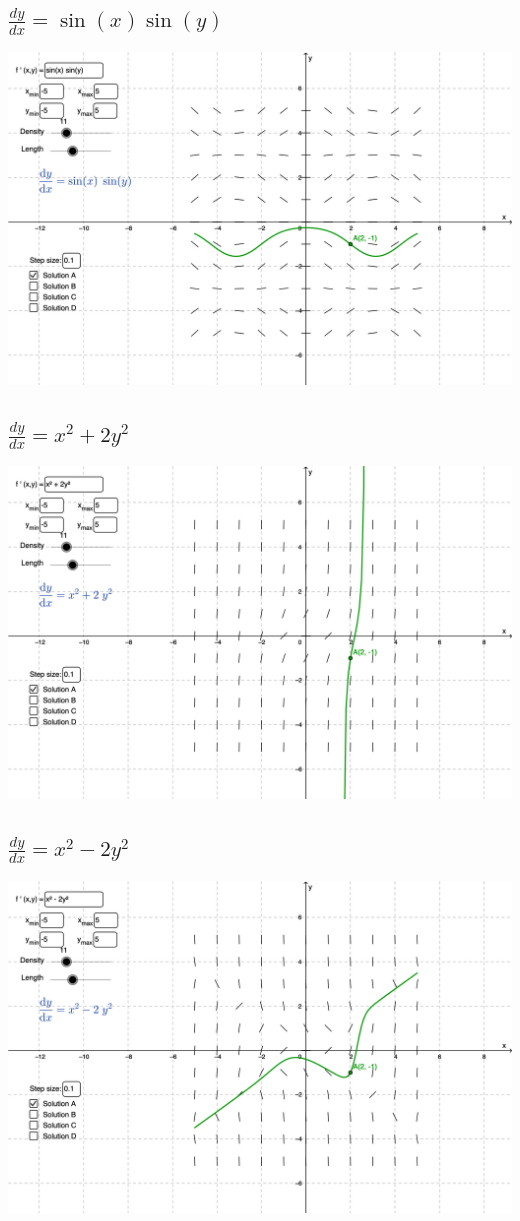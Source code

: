 \documentclass{article}
\begin{document}
\subsection{ $ \frac{dy}{dx} = \sin(x)\sin(y) $ }

\includegraphics[width=\textwidth]{graph_3.png}

\subsection{ $ \frac{dy}{dx} = x^2 + 2y^2 $ }

\includegraphics[width=\textwidth]{graph_4.png}

\subsection{ $ \frac{dy}{dx} = x^2 - 2y^2 $ }

\includegraphics[width=\textwidth]{graph_5.png}
\end{document}
